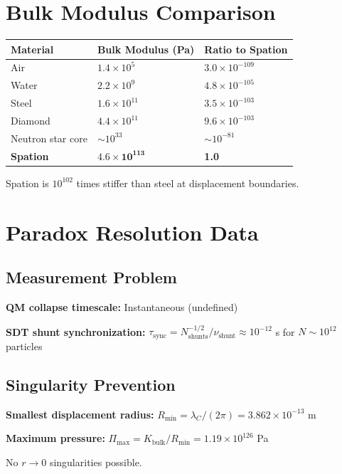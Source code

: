 \documentclass{article}
\begin{document}
\section{Bulk Modulus Comparison}

\begin{longtable}{lll}
\toprule
\textbf{Material} & \textbf{Bulk Modulus (Pa)} & \textbf{Ratio to Spation} \\
\midrule
Air & $1.4 \times 10^5$ & $3.0 \times 10^{-109}$ \\
Water & $2.2 \times 10^9$ & $4.8 \times 10^{-105}$ \\
Steel & $1.6 \times 10^{11}$ & $3.5 \times 10^{-103}$ \\
Diamond & $4.4 \times 10^{11}$ & $9.6 \times 10^{-103}$ \\
Neutron star core & $\sim 10^{33}$ & $\sim 10^{-81}$ \\
\textbf{Spation} & $\mathbf{4.6 \times 10^{113}}$ & \textbf{1.0} \\
\bottomrule
\end{longtable}

Spation is $10^{102}$ times stiffer than steel at displacement boundaries.

\section{Paradox Resolution Data}

\subsection{Measurement Problem}

\textbf{QM collapse timescale:} Instantaneous (undefined)

\textbf{SDT shunt synchronization:} $\tau_{\text{sync}} = N_{\text{shunts}}^{-1/2} / \nu_{\text{shunt}} \approx 10^{-12}$ s for $N \sim 10^{12}$ particles

\subsection{Singularity Prevention}

\textbf{Smallest displacement radius:} $R_{\text{min}} = \lambda_C / (2\pi) = 3.862 \times 10^{-13}$ m

\textbf{Maximum pressure:} $\Pi_{\text{max}} = K_{\text{bulk}} / R_{\text{min}} = 1.19 \times 10^{126}$ Pa

No $r \to 0$ singularities possible.
\end{document}
